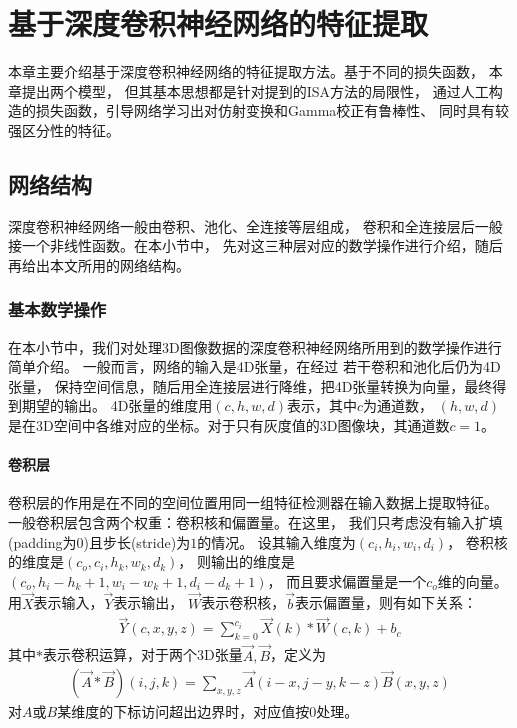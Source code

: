 
\chapter{基于深度卷积神经网络的特征提取}
本章主要介绍基于深度卷积神经网络的特征提取方法。基于不同的损失函数，
本章提出两个模型，
但其基本思想都是针对提到的ISA方法的局限性，
通过人工构造的损失函数，引导网络学习出对仿射变换和Gamma校正有鲁棒性、
同时具有较强区分性的特征。

\section{网络结构}
深度卷积神经网络一般由卷积、池化、全连接等层组成，
卷积和全连接层后一般接一个非线性函数。在本小节中，
先对这三种层对应的数学操作进行介绍，随后再给出本文所用的网络结构。

\subsection{基本数学操作}
在本小节中，我们对处理3D图像数据的深度卷积神经网络所用到的数学操作进行简单介绍。
一般而言，网络的输入是4D张量，在经过 若干卷积和池化后仍为4D张量，
保持空间信息，随后用全连接层进行降维，把4D张量转换为向量，最终得到期望的输出。
4D张量的维度用$(c, h, w, d)$表示，其中$c$为通道数，
$(h, w, d)$是在3D空间中各维对应的坐标。对于只有灰度值的3D图像块，其通道数$c=1$。

\subsubsection{卷积层}
卷积层的作用是在不同的空间位置用同一组特征检测器在输入数据上提取特征。
一般卷积层包含两个权重：卷积核和偏置量。在这里，
我们只考虑没有输入扩填(padding为0)且步长(stride)为$1$的情况。
设其输入维度为$(c_i, h_i, w_i, d_i)$，
卷积核的维度是$(c_o, c_i, h_k, w_k, d_k)$，
则输出的维度是$(c_o, h_i - h_k + 1, w_i - w_k + 1, d_i - d_k + 1)$，
而且要求偏置量是一个$c_o$维的向量。用$\vec{X}$表示输入，$\vec{Y}$表示输出，
$\vec{W}$表示卷积核，$\vec{b}$表示偏置量，则有如下关系：
\begin{eqnarray}
    \vec{Y}(c, x, y, z) = \sum_{k=0}^{c_i} \vec{X}(k) * \vec{W}(c, k) + b_c
\end{eqnarray}
其中$*$表示卷积运算，对于两个3D张量$\vec{A}, \vec{B}$，定义为
\begin{eqnarray}
    (\vec{A} * \vec{B})(i, j, k) = \sum_{x, y, z}\vec{A}(i-x, j-y, k-z)
        \vec{B}(x,y,z)
\end{eqnarray}
对$A$或$B$某维度的下标访问超出边界时，对应值按$0$处理。

